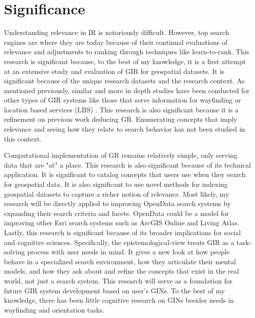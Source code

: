 \chapter{Significance} \label{ch:[chapter 6 label]}

Understanding relevance in IR is notoriously difficult. However, top search engines are where they are today because of their continual evaluations of relevance and adjustments to ranking through techniques like learn-to-rank. This research is significant because, to the best of my knowledge, it is a first attempt at an extensive study and evaluation of GIR for geospatial datasets. It is significant because of the unique research datasets and the research context. As mentioned previously, similar and more in depth studies have been conducted for other types of GIR systems like those that serve information for wayfinding or location based services (LBS) \cite{DeSabbata2012}. This research is also significant because it is a refinement on previous work deducing GR. Enumerating concepts that imply relevance and seeing how they relate to search behavior has not been studied in this context.

Computational implementation of GR remains relatively simple, only serving data that are "at" a place. This research is also significant because of its technical application. It is significant to catalog concepts that users use when they search for geospatial data. It is also significant to use novel methods for indexing geospatial datasets to capture a richer notion of relevance. Most likely, my research will be directly applied to improving OpenData search systems by expanding their search criteria and facets. OpenData could be a model for improving other Esri search systems such as ArcGIS Online and Living Atlas. Lastly, this research is significant because of its broader implications for social and cognitive sciences. Specifically, the epistemological-view treats GIR as a task-solving process with user needs in mind. It gives a new look at how people behave in a specialized search environment, how they articulate their mental models, and how they ask about and refine the concepts that exist in the real world, not just a search system. This research will serve as a foundation for future GIR system development based on user’s GINs. To the best of my knowledge, there has been little cognitive research on GINs besides needs in wayfinding and orientation tasks.